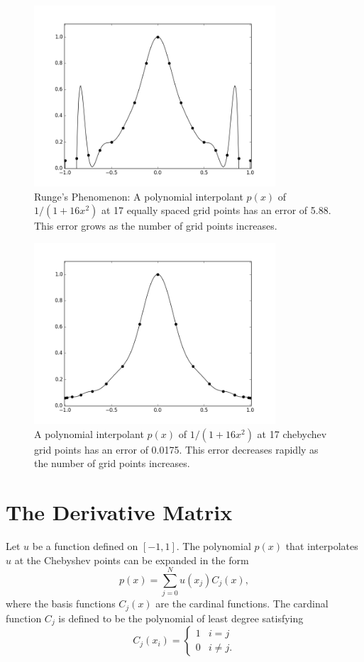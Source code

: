 \begin{figure}[ht]
\centering
\includegraphics[width=9cm]{equally_spaced_points.png}
\caption{Runge's Phenomenon: A polynomial interpolant $p(x)$ of  $1/(1+16x^2)$ at 17 equally spaced grid points has an error of 5.88. This error grows as the number of grid points increases.}
\label{Spectral1:equally_spaced_points}
\end{figure}

\begin{figure}[ht]
\centering
\includegraphics[width=9cm]{chebychev_points.png}
\caption{A polynomial interpolant $p(x)$ of $1/(1+16x^2)$ at 17 chebychev grid points has an error of 0.0175. This error decreases rapidly as the number of grid points increases.}
\label{Spectral1:chebychev_points}
\end{figure}


\section{The Derivative Matrix}
Let $u$ be a function defined on $[-1,1]$. The polynomial $p(x)$ that interpolates $u$ at the Chebyshev points can be expanded in the form 
\[p(x) = \sum_{j=0}^N u(x_j)C_j(x),\]
where the basis functions $C_j(x)$ are the cardinal functions. The cardinal function $C_j$ is defined to be the polynomial of least degree satisfying
\begin{equation*}
C_j(x_i) = \begin{cases} 1 & i=j \\ 0 & i \not = j.
   \end{cases}
\end{equation*}


